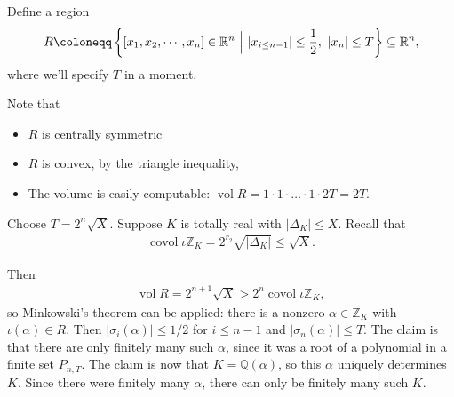 \begin{remark}

Define a region
\begin{align*}
R \coloneqq\left\{{{\left[ {{ {x}_1, {x}_2, \cdots, {x}_{n}}} \right]} \in {\mathbb{R}}^n {~\mathrel{\Big|}~}{\left\lvert {x_{i\leq n-1}} \right\rvert} \leq {1 \over 2},\,\, {\left\lvert {x_n} \right\rvert} \leq T }\right\} \subseteq {\mathbb{R}}^n
,\end{align*}
where we'll specify \(T\) in a moment.

Note that

\begin{itemize}
\tightlist
\item
  \(R\) is centrally symmetric
\item
  \(R\) is convex, by the triangle inequality,
\item
  The volume is easily computable:
  \(\operatorname{vol}R = 1\cdot 1\cdot \ldots \cdot 1 \cdot 2T = 2T\).
\end{itemize}

Choose \(T = 2^n \sqrt{X}\). Suppose \(K\) is totally real with
\({\left\lvert { {\Delta}_K } \right\rvert} \leq X\). Recall that
\begin{align*}
\operatorname{covol}\iota {\mathbb{Z}}_K = 2^{r_2} \sqrt{{\left\lvert {{\Delta}_K} \right\rvert}} 
\leq \sqrt{X}
.\end{align*}

Then
\begin{align*}
\operatorname{vol}R = 2^{n+1 } \sqrt{X} > 2^n \operatorname{covol}\iota {\mathbb{Z}}_K
,\end{align*}
so Minkowski's theorem can be applied: there is a nonzero
\(\alpha\in {\mathbb{Z}}_K\) with \(\iota( \alpha) \in R\). Then
\({\left\lvert {\sigma_i( \alpha)} \right\rvert} \leq 1/2\) for
\(i\leq n-1\) and
\({\left\lvert { \sigma_n ( \alpha)} \right\rvert} \leq T\). The claim
is that there are only finitely many such \(\alpha\), since it was a
root of a polynomial in a finite set \(P_{n, T}\). The claim is now that
\(K = {\mathbb{Q}}( \alpha)\), so this \(\alpha\) uniquely determines
\(K\). Since there were finitely many \(\alpha\), there can only be
finitely many such \(K\).


\end{remark}
